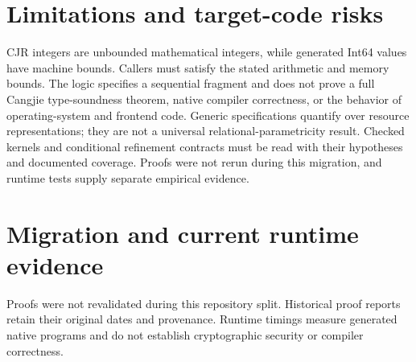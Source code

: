 \documentclass[11pt]{article}
\begin{document}



\section{Limitations and target-code risks}
\label{sec:limitations}
CJR integers are unbounded mathematical integers, while generated Int64 values
have machine bounds. Callers must satisfy the stated arithmetic and memory
bounds. The logic specifies a sequential fragment and does not prove a full
Cangjie type-soundness theorem, native compiler correctness, or the behavior
of operating-system and frontend code. Generic specifications quantify over
resource representations; they are not a universal relational-parametricity
result. Checked kernels and conditional refinement contracts must be read
with their hypotheses and documented coverage. Proofs were not rerun during
this migration, and runtime tests supply separate empirical evidence.

\section{Migration and current runtime evidence}
Proofs were not revalidated during this repository split. Historical proof reports retain their original dates and provenance. Runtime timings measure generated native programs and do not establish cryptographic security or compiler correctness.

\end{document}
